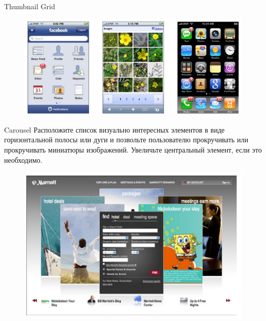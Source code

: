 \documentclass{beamer}
\begin{document}
\begin{frame}[t]{Thumbnail Grid}
	\begin{figure}[h]
		\centering
		\includegraphics[scale=0.6]{images/lec07-pic56.png}
	\end{figure}
\end{frame}	

\begin{frame}[t]{Carousel}
	Расположите список визуально интересных элементов в виде горизонтальной полосы или дуги и позвольте пользователю
прокручивать или прокручивать миниатюры изображений. Увеличьте центральный элемент, если это необходимо.
	\begin{figure}[h]
		\centering
		\includegraphics[scale=0.5]{images/lec07-pic57.png}
	\end{figure}
\end{frame}	
\end{document}
